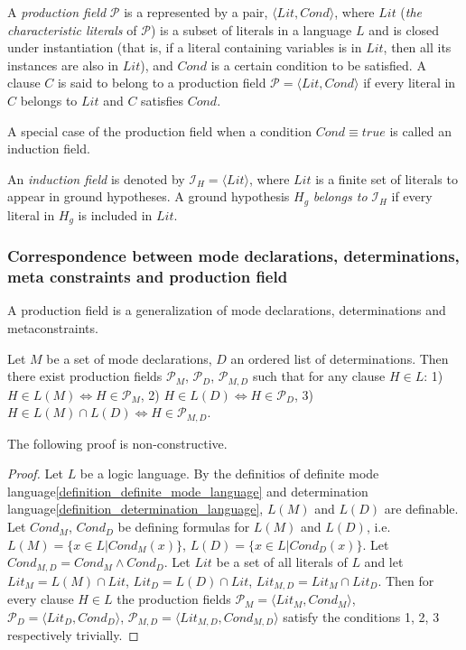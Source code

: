 \begin{defn}\cite{inoue2004induction}
A \emph{production field} $\mathcal{P}$ is a represented by a pair,
$\langle Lit, Cond\rangle$, where $Lit$
(\emph{the characteristic literals} of $\mathcal{P}$) is a subset of literals in a language $L$ and is closed under instantiation (that is, if a literal containing variables is in $Lit$, then all its instances are also in $Lit$), and $Cond$ is a certain condition to be satisfied. 
A clause $C$ is said to belong to a production field $\mathcal{P} = \langle Lit, Cond \rangle$ if every literal in $C$ belongs to $Lit$ and $C$ satisfies $Cond$.
\end{defn}

A special case of the production field when a condition $Cond \equiv true$ is called an induction field.

\begin{defn}\cite{yamamoto2012inverse}\label{induction_field_definition}
An \emph{induction field} is denoted by $\mathcal{I}_H = \langle Lit \rangle$,
where $Lit$ is a finite
set of literals to appear in ground hypotheses.
A ground hypothesis $H_g$ \emph{belongs to} $\mathcal{I}_H$ if
every literal in $H_g$ is included in $Lit$.
\end{defn}

\subsubsection{Correspondence between mode declarations, determinations, meta constraints and production field}
A production field is a generalization of mode declarations, determinations and metaconstraints.

\begin{proposition}\label{md_d_pf_correspondence_proposition}
Let $M$ be a set of mode declarations, $D$ an ordered list of determinations. Then there exist production fields
$\mathcal{P}_M$,
$\mathcal{P}_D$,
$\mathcal{P}_{M,D}$
such that for any clause $H \in L$:
1) $H \in L(M) \iff H \in \mathcal{P}_M$,
2) $H \in L(D) \iff H \in \mathcal{P}_D$,
3) $H \in L(M) \cap L(D) \iff H \in \mathcal{P}_{M,D}$.
\end{proposition}
The following proof is non-constructive.
\begin{proof}
Let $L$ be a logic language. By the definitios of definite mode language\ref{definition_definite_mode_language} and determination language\ref{definition_determination_language}, $L(M)$ and $L(D)$ are definable.
Let $Cond_M$, $Cond_D$ be defining formulas for $L(M)$ and $L(D)$, i.e. $L(M)=\{x \in L | Cond_M(x)\}$, $L(D)=\{x \in L | Cond_D(x)\}$.
Let $Cond_{M,D}=Cond_M \land Cond_D$. Let $Lit$ be a set of all literals of $L$ and let
$Lit_M=L(M) \cap Lit$,
$Lit_D=L(D) \cap Lit$,
$Lit_{M,D}=Lit_M \cap Lit_D$.
Then for every clause $H \in L$ the production fields
$\mathcal{P}_M=\langle Lit_M, Cond_M \rangle$,
$\mathcal{P}_D=\langle Lit_D, Cond_D \rangle$,
$\mathcal{P}_{M,D}=\langle Lit_{M,D}, Cond_{M,D} \rangle$
satisfy the conditions 1, 2, 3 respectively trivially.
\end{proof}

